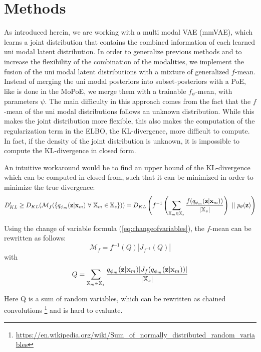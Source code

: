 \section{Methods}
\label{sec:methods}
As introduced herein, we are working with a multi modal VAE (mmVAE), which learns a joint distribution that contains the combined information of each learned uni modal latent distribution.
In order to generalize previous methods and to increase the flexibility of the combination of the modalities, we implement the fusion of the uni modal latent distributions with a mixture of generalized $f$-mean.
Instead of merging the uni modal posteriors into subset-posteriors with a PoE, like is done in the MoPoE, we merge them with a trainable $f_{\psi}$-mean, with parameters $\psi$.
The main difficulty in this approach comes from the fact that the $f$-mean of the uni modal distributions follows an unknown distribution.
While this makes the joint distribution more flexible, this also makes the computation of the regularization term in the ELBO, the KL-divergence, more difficult to compute.
In fact, if the density of the joint distribution is unknown, it is impossible to compute the KL-divergence in closed form.

An intuitive workaround would be to find an upper bound of the KL-divergence which can be computed in closed from, such that it can be minimized in order to minimize the true divergence:
\begin{equation}
    \label{eq:kldivbound}
    D_{KL}^{\prime} \geq D_{KL}(\mathcal{M}_f(\{\unimodalpost\ \forall\ \xsetm \in \xsubset\})) =  D_{KL}\left(f^{-1}\left(\sum _{\xsetm \in \xsubset} \frac{f(\unimodalpost)}{|\xsubset|}\right)\ ||\ \prior\right)
\end{equation}

Using the change of variable formula (\cref{eq:changeofvariables}), the $f$-mean can be rewritten as follows:
\begin{equation}
    \mathcal{M}_f = f^{-1}(Q)|J_{f^{-1}}(Q)|
\end{equation}
with
\begin{equation}
    Q= \sum _{\mathbb{X}_m \in \mathbb{X}_s} \frac{q_{\phi_m}(\textbf{z}|\textbf{x}_m)|J_f(q_{\phi_m}(\textbf{z}|\textbf{x}_m))|}{|\mathbb{X}_s|}
\end{equation}

Here Q is a sum of random variables, which can be rewritten as chained convolutions \footnote{\url{https://en.wikipedia.org/wiki/Sum_of_normally_distributed_random_variables}} and is hard to evaluate.

